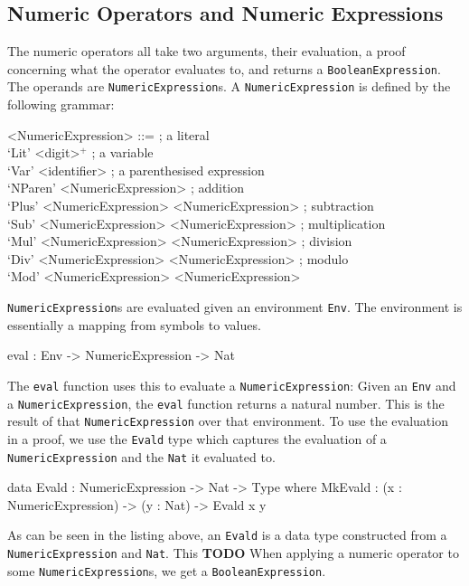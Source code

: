     \subsection{Numeric Operators and Numeric Expressions}
        The numeric operators all take two arguments, their evaluation, a proof concerning what the operator evaluates to, and returns a \texttt{BooleanExpression}.
        The operands are \texttt{NumericExpression}s. A \texttt{NumericExpression} is defined by the following grammar:
        \setlength{\grammarindent}{12em}
        \begin{grammar}
            <NumericExpression>
            ::=  ; a literal\\
                 `Lit' <digit>$^+$
            \alt ; a variable\\
                 `Var' <identifier>
            \alt ; a parenthesised expression\\
                 `NParen' <NumericExpression>
            \alt ; addition\\
                 `Plus' <NumericExpression> <NumericExpression>
            \alt ; subtraction\\
                 `Sub' <NumericExpression> <NumericExpression>
            \alt ; multiplication\\
                 `Mul' <NumericExpression> <NumericExpression>
            \alt ; division\\
                 `Div' <NumericExpression> <NumericExpression>
            \alt ; modulo\\
                 `Mod' <NumericExpression> <NumericExpression>
        \end{grammar}
        \texttt{NumericExpression}s are evaluated given an environment \texttt{Env}. The environment is essentially a mapping from symbols to values.
        \begin{code}[caption={The type of the \texttt{eval} function}]
            eval : Env -> NumericExpression -> Nat
        \end{code}
        The \texttt{eval} function uses this to evaluate a \texttt{NumericExpression}: Given an \texttt{Env} and a \texttt{NumericExpression}, the \texttt{eval} function returns a natural number. This is the result of that \texttt{NumericExpression} over that environment. To use the evaluation in a proof, we use the \texttt{Evald} type which captures the evaluation of a \texttt{NumericExpression} and the \texttt{Nat} it evaluated to.
        \begin{code}[caption={\texttt{Evald} as defined in the \textsc{TeamPlay} CSL}]
    data Evald : NumericExpression -> Nat -> Type where
        MkEvald : (x : NumericExpression) -> (y : Nat) -> Evald x y
        \end{code}
        As can be seen in the listing above, an \texttt{Evald} is a data type constructed from a \texttt{NumericExpression} and \texttt{Nat}. This \textbf{TODO}
        When applying a numeric operator to some \texttt{NumericExpression}s, we get a \texttt{BooleanExpression}.
    
